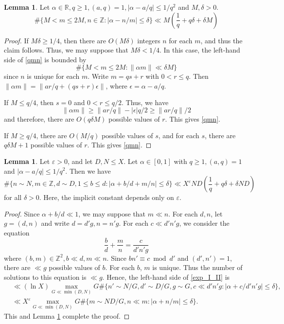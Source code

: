 \documentclass{amsart}
\theoremstyle{definition}
\newtheorem{lem}[dfn]{Lemma}
\theoremstyle{remark}
\newcommand{\1}{
    \bm{1}
}
\begin{document}
\begin{lem}\label{bohr}
Let $\alpha \in \mathbb{R}, q \geq 1, (a,q)=1, |\alpha-a/q| \leq 1/q^2$ and $M,\delta>0$. 
\begin{equation} \#\{ M<m \leq 2M,n \in \mathbb{Z} : |\alpha - n/m| \leq \delta \} \ll M \left( \frac{1}{q} + q \delta + \delta M \right)  \label{qmn} \end{equation}
\end{lem}
\begin{proof}
If $M \delta \geq 1/4$, then there are $O(M\delta)$ integers $n$ for each $m$, and thus the claim follows. Thus, we may suppose that $M \delta < 1/4$. In this case, the left-hand side of \eqref{qmn} is bounded by
\[ \#\{ M<m \leq 2M : \| \alpha m\| \ll \delta M \} \]
since $n$ is unique for each $m$. Write $m=qs+r$ with $0< r \leq q$. Then $\|\alpha m\| =\|ar/q+(qs+r) \epsilon \|$, where $\epsilon=\alpha-a/q$.  

If $M \leq q/4$, then $s=0$ and $0<r\leq q/2$. Thus, we have
\[ \|\alpha m\| \geq \|ar/q\|-|\epsilon| q/2 \geq \|ar/q\|/2 \]
and therefore, there are $O(q \delta M)$ possible values of $r$. This gives \eqref{qmn}. 

If $M \geq q/4$, there are $O(M/q)$ possible values of $s$, and for each $s$, there are $q \delta M+1$ possible values of $r$. This gives \eqref{qmn}. 
\end{proof}




\begin{lem}\label{bohr_dn}
Let $\varepsilon>0$, and let $D,N \leq X$. Let $\alpha \in [0,1]$ with $q \geq 1, (a,q)=1$ and $|\alpha-a/q| \leq 1/q^2$. Then we have
\begin{equation} \label{exp_I_II} \#\{n \sim N, m \in \mathbb{Z},d \sim D, 1 \leq b \leq d : |\alpha+b/d + m/n| \leq \delta \} \ll X^{\varepsilon} ND \left( \frac{1}{q} + q \delta + \delta ND \right) \end{equation}
for all $\delta>0$. Here, the implicit constant depends only on $\varepsilon$. 
\end{lem}

\begin{proof}
Since $\alpha+b/d \ll 1$, we may suppose that $m \ll n$. 
For each $d,n$, let $g=(d,n)$ and write $d=d'g, n=n'g$. For each $c \ll d'n'g$, we consider the equation
\[ \frac{b}{d} + \frac{m}{n} = \frac{c}{d'n'g} \]
where $(b,m) \in \mathbb{Z}^2, b \ll d, m \ll n$. Since $bn' \equiv c \bmod d'$ and $(d',n')=1$, there are $\ll g$ possible values of $b$. For each $b$, $m$ is unique. Thus the number of solutions to this equation is $\ll g$. Hence, the left-hand side of \eqref{exp_I_II} is
\begin{align*}
&\ll (\ln{X}) \max_{G \ll \min(D,N)} G \#\{n' \sim N/G, d' \sim D/G, g \sim G, c \ll d'n'g : |\alpha+c/d'n'g| \leq \delta \}, \\
&\ll X^{\varepsilon} \max_{G \ll \min(D,N)} G \#\{m \sim ND/G, n \ll m : |\alpha+n/m| \leq \delta \}. 
\end{align*}
This and Lemma \ref{bohr} complete the proof. 
\end{proof}
\end{document}
